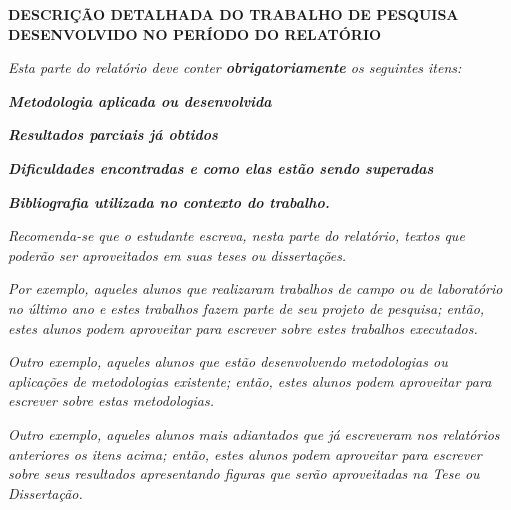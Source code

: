 \documentclass[12pt,a4paper]{article}
\begin{document}
\newpage

\begin{center}
\textbf{\large DESCRIÇÃO DETALHADA DO TRABALHO DE PESQUISA DESENVOLVIDO NO
PERÍODO DO RELATÓRIO}
\end{center}

\vspace{1cm}

\textit{
Esta parte do relatório deve conter \textbf{obrigatoriamente}
os seguintes itens:
}

\vspace{1cm}

{\centering\bfseries\itshape
Metodologia aplicada ou desenvolvida
\par}

\bigskip

{\centering\bfseries\itshape
Resultados parciais já obtidos
\par}

\bigskip

{\centering\bfseries\itshape
Dificuldades encontradas e como elas estão sendo superadas
\par}

\bigskip

{\centering\bfseries\itshape
Bibliografia utilizada no contexto do trabalho.
\par}

\bigskip

\bigskip

{\itshape
Recomenda-se que o estudante escreva, nesta parte do relatório, textos que
poderão ser aproveitados em suas teses ou dissertações.}

\bigskip

{\itshape
Por exemplo, aqueles alunos que realizaram trabalhos de campo ou de laboratório
no último ano e estes trabalhos fazem parte de seu projeto de pesquisa; então,
estes alunos podem aproveitar para escrever sobre estes trabalhos executados.}

\bigskip

{\itshape
Outro exemplo, aqueles alunos que estão desenvolvendo metodologias ou
aplicações de metodologias existente; então, estes alunos podem aproveitar
para escrever sobre estas metodologias.}

\bigskip

{\itshape
Outro exemplo, aqueles alunos mais adiantados que já escreveram nos relatórios
anteriores os itens acima; então, estes alunos podem aproveitar para escrever
sobre seus resultados apresentando figuras que serão aproveitadas na Tese ou
Dissertação.}
\end{document}
